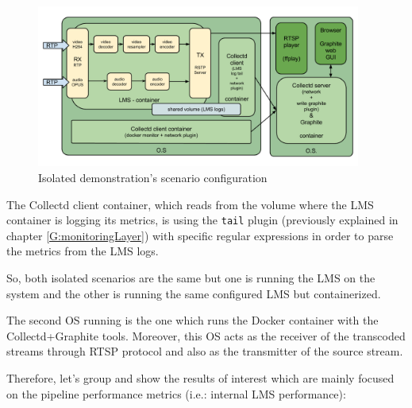 \begin{figure}[!htb]
\begin{center}
\includegraphics[width=0.95\textwidth]{./images/isolatedScenario.png}
\caption{Isolated demonstration's scenario configuration}
\label{F:idsc}
\end{center}
\end{figure}

The Collectd client container, which reads from the volume where the LMS container is logging its metrics, is using the \texttt{tail} plugin (previously explained in chapter \ref{G:monitoringLayer}) with specific regular expressions in order to parse the metrics from the LMS logs.

So, both isolated scenarios are the same but one is running the LMS on the system and the other is running the same configured LMS but containerized.

The second OS running is the one which runs the Docker container with the Collectd+Graphite tools. Moreover, this OS acts as the receiver of the transcoded streams through RTSP protocol and also as the transmitter of the source stream.

Therefore, let's group and show the results of interest which are mainly focused on the pipeline performance metrics (i.e.: internal LMS performance):

